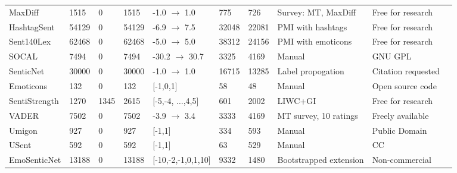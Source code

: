 {\begin{tabular*}{\linewidth}{ l | l | l | l | l | l | l | l | l | l}
    MaxDiff & 1515 & 0 & 1515 & -1.0 $\to$ 1.0 & 775 & 726 & Survey: MT, MaxDiff & Free for research & \cite{kiritchenko2014sentiment}\\
    HashtagSent & 54129 & 0 & 54129 & -6.9 $\to$ 7.5 & 32048 & 22081 & PMI with hashtags & Free for research & \cite{zhu2014nrc}\\
    Sent140Lex & 62468 & 0 & 62468 & -5.0 $\to$ 5.0 & 38312 & 24156 & PMI with emoticons & Free for research & \cite{MohammadKZ2013}\\
    SOCAL & 7494 & 0 & 7494 & -30.2 $\to$ 30.7 & 3325 & 4169 & Manual & GNU GPL & \cite{taboada2011lexicon}\\
    SenticNet & 30000 & 0 & 30000 & -1.0 $\to$ 1.0 & 16715 & 13285 & Label propogation & Citation requested & \cite{cambria2014senticnet}\\
    Emoticons & 132 & 0 & 132 & [-1,0,1] & 58 & 48 & Manual & Open source code & \cite{gonccalves2013comparing}\\
    SentiStrength & 1270 & 1345 & 2615 & [-5,-4, $\ldots$,4,5] & 601 & 2002 & LIWC+GI & Free for research & \cite{thelwall2010sentiment}\\
    VADER & 7502 & 0 & 7502 & -3.9 $\to$ 3.4 & 3333 & 4169 & MT survey, 10 ratings & Freely available & \cite{hutto2014vader}\\
    Umigon & 927 & 0 & 927 & [-1,1] & 334 & 593 & Manual & Public Domain & \cite{levallois2013umigon}\\
    USent & 592 & 0 & 592 & [-1,1] & 63 & 529 & Manual & CC & \cite{pappas2013distinguishing}\\
    EmoSenticNet & 13188 & 0 & 13188 & [-10,-2,-1,0,1,10] & 9332 & 1480 & Bootstrapped extension & Non-commercial & \cite{poria2013enhanced}\\
  \end{tabular*}}
